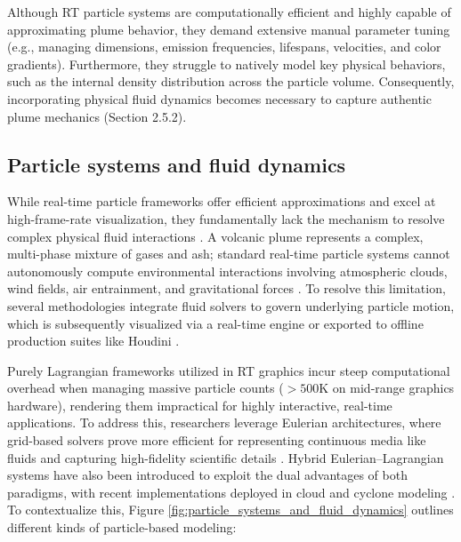 Although RT particle systems are computationally efficient and highly capable of approximating plume behavior, they demand extensive manual parameter tuning (e.g., managing dimensions, emission frequencies, lifespans, velocities, and color gradients). 
Furthermore, they struggle to natively model key physical behaviors, such as the internal density distribution across the particle volume. 
Consequently, incorporating physical fluid dynamics becomes necessary to capture authentic plume mechanics (Section 2.5.2).

\subsection{Particle systems and fluid dynamics}


While real-time particle frameworks offer efficient approximations and excel at high-frame-rate visualization, they fundamentally lack the mechanism to resolve complex physical fluid interactions \cite{nishita2001modeling}. 
A volcanic plume represents a complex, multi-phase mixture of gases and ash; standard real-time particle systems cannot autonomously compute environmental interactions involving atmospheric clouds, wind fields, air entrainment, and gravitational forces \cite{lastic2022interactive, pretorius2024volcanic}. 
To resolve this limitation, several methodologies integrate fluid solvers to govern underlying particle motion, which is subsequently visualized via a real-time engine or exported to offline production suites like Houdini \cite{fedkiw2003simulating, pfaff2012lagrangian, lastic2022interactive, pretorius2024volcanic}.

Purely Lagrangian frameworks utilized in RT graphics incur steep computational overhead when managing massive particle counts ($> 500\text{K}$ on mid-range graphics hardware), rendering them impractical for highly interactive, real-time applications. 
To address this, researchers leverage Eulerian architectures, where grid-based solvers prove more efficient for representing continuous media like fluids and capturing high-fidelity scientific details \cite{janicke2010measuring, pfaff2012lagrangian, saidi2014comparison}. 
Hybrid Eulerian–Lagrangian systems have also been introduced to exploit the dual advantages of both paradigms, with recent implementations deployed in cloud and cyclone modeling \cite{vimont2020interactive, stam2023stable, pretorius2024volcanic, amador2024cyclogenesis}.
To contextualize this, Figure \ref{fig:particle_systems_and_fluid_dynamics} outlines different kinds of particle-based modeling:

